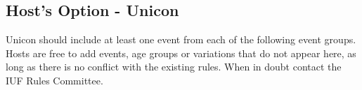 \subsection{Host's Option - Unicon}
Unicon should include at least one event from each of the following event groups. 
Hosts are free to add events, age groups or variations that do not appear here, as long as there is no conflict with the existing rules. 
When in doubt contact the IUF Rules Committee.

